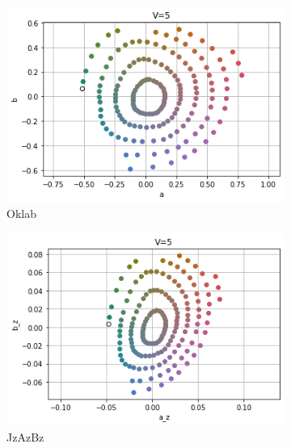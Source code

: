\documentclass[12pt, a4paper, ngerman]{article}
\begin{document}
\begin{figure}
  \centering
  \begin{subfigure}[b]{0.3\linewidth}
    \includegraphics[width=\linewidth]{Grafiken/Vergleich_Munsell/oklab_munsell.png}
    \caption{Oklab}
    \label{fig:munsell_oklab}
  \end{subfigure}
  \begin{subfigure}[b]{0.3\linewidth}
    \includegraphics[width=\linewidth]{Grafiken/Vergleich_Munsell/jzazbz_munsell.png}
    \caption{JzAzBz}
    \label{fig:munsell_jzazbz}
  \end{subfigure}
  \begin{subfigure}[b]{0.3\linewidth}

\end{subfigure}
\end{figure}
\end{document}

